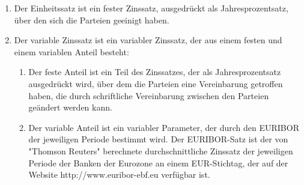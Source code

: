 \begin{enumerate}
\item{Der Einheitssatz ist ein fester Zinssatz, ausgedrückt als Jahresprozentsatz, über den sich die Parteien geeinigt haben.}

\item{Der variable Zinssatz ist ein variabler Zinssatz, der aus einem festen und einem variablen Anteil besteht:}

\begin{enumerate}

	\item Der feste Anteil ist ein Teil des Zinssatzes, der als Jahresprozentsatz ausgedrückt wird, über dem die Parteien eine Vereinbarung getroffen haben, die durch schriftliche Vereinbarung zwischen den Parteien geändert werden kann.
	\item Der variable Anteil ist ein variabler Parameter, der durch den EURIBOR der jeweiligen Periode bestimmt wird. Der EURIBOR-Satz ist der von "Thomson Reuters" berechnete durchschnittliche Zinssatz der jeweiligen Periode der Banken der Eurozone an einem EUR-Stichtag, der auf der Website http://www.euribor-ebf.eu verfügbar ist.

\end{enumerate}


\end{enumerate}
